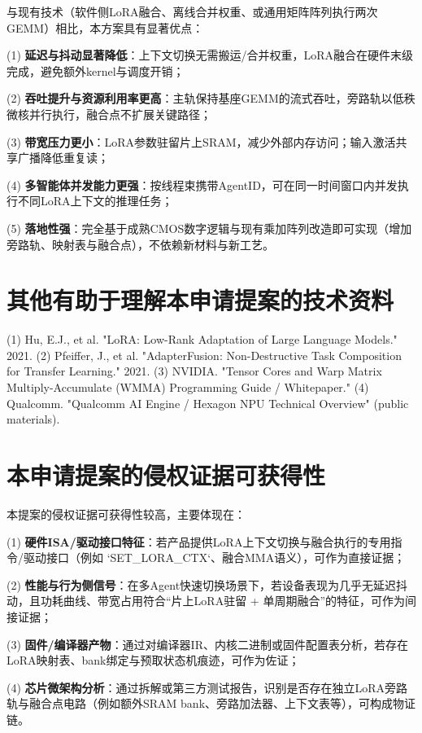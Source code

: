 \documentclass[12pt,a4paper]{article}
\begin{document}
与现有技术（软件侧LoRA融合、离线合并权重、或通用矩阵阵列执行两次GEMM）相比，本方案具有显著优点：

(1) \textbf{延迟与抖动显著降低}：上下文切换无需搬运/合并权重，LoRA融合在硬件末级完成，避免额外kernel与调度开销；

(2) \textbf{吞吐提升与资源利用率更高}：主轨保持基座GEMM的流式吞吐，旁路轨以低秩微核并行执行，融合点不扩展关键路径；

(3) \textbf{带宽压力更小}：LoRA参数驻留片上SRAM，减少外部内存访问；输入激活共享广播降低重复读；

(4) \textbf{多智能体并发能力更强}：按线程束携带AgentID，可在同一时间窗口内并发执行不同LoRA上下文的推理任务；

(5) \textbf{落地性强}：完全基于成熟CMOS数字逻辑与现有乘加阵列改造即可实现（增加旁路轨、映射表与融合点），不依赖新材料与新工艺。

\section{其他有助于理解本申请提案的技术资料}

(1) Hu, E.J., et al. "LoRA: Low-Rank Adaptation of Large Language Models." 2021.
(2) Pfeiffer, J., et al. "AdapterFusion: Non-Destructive Task Composition for Transfer Learning." 2021.
(3) NVIDIA. "Tensor Cores and Warp Matrix Multiply-Accumulate (WMMA) Programming Guide / Whitepaper."
(4) Qualcomm. "Qualcomm AI Engine / Hexagon NPU Technical Overview" (public materials).

\section{本申请提案的侵权证据可获得性}

本提案的侵权证据可获得性较高，主要体现在：

(1) \textbf{硬件ISA/驱动接口特征}：若产品提供LoRA上下文切换与融合执行的专用指令/驱动接口（例如 `SET\_LORA\_CTX`、融合MMA语义），可作为直接证据；

(2) \textbf{性能与行为侧信号}：在多Agent快速切换场景下，若设备表现为几乎无延迟抖动，且功耗曲线、带宽占用符合“片上LoRA驻留 + 单周期融合”的特征，可作为间接证据；

(3) \textbf{固件/编译器产物}：通过对编译器IR、内核二进制或固件配置表分析，若存在LoRA映射表、bank绑定与预取状态机痕迹，可作为佐证；

(4) \textbf{芯片微架构分析}：通过拆解或第三方测试报告，识别是否存在独立LoRA旁路轨与融合点电路（例如额外SRAM bank、旁路加法器、上下文表等），可构成物证链。
\end{document}
